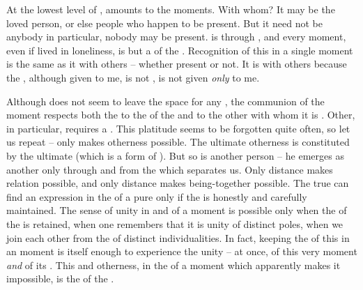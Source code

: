 \pa\imm At the lowest level of , 
amounts to  the  moments.  With whom? It may be
the loved person, or else people who happen to be present. But it need not be
anybody in particular, nobody may be  present.  
is  through , and every moment, even if lived in
loneliness, is but a  of the . Recognition of this
 in a single moment is the same as  it with others --
whether  present or not. It is  with others because the
, although given to me, is not , is not given {\em only} to
me.

Although  does not seem to leave the space for any ,
the  communion of the moment respects both the  to the
 of the  and to the other with whom it is .
Other, in particular, requires a . This platitude seems to be
forgotten quite often, so let us repeat -- only  makes otherness
possible. The ultimate otherness is constituted by the ultimate
 (which is a form of ). But so is another person
-- he emerges as another only through and from the  which separates
us. Only distance makes relation possible, and only distance makes
being-together possible. The true  can find an expression in the
 of a pure  only if the  is honestly and
carefully maintained. The sense of unity in and of a moment is possible only
when the  of the  is retained, when one remembers that it is
unity of distinct poles, when we join each other from the  of
distinct individualities. In fact, keeping the  of this 
in an  moment is itself enough to experience the unity -- at once, of
 this very moment {\em and} of  its .  This
 and otherness,  in the  of a moment
which apparently makes it impossible, is the  of the .


